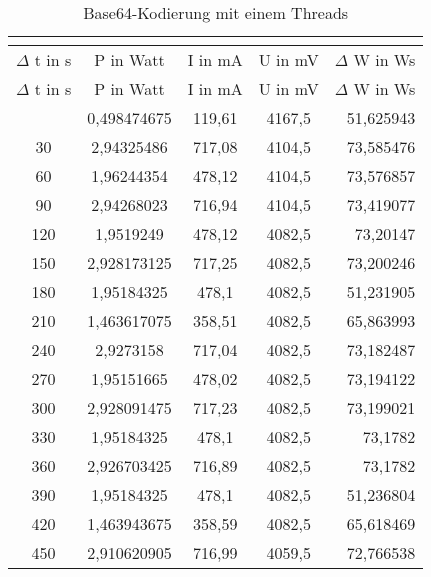 \begin{longtable}[c]{ccccc}
\caption{Base64-Kodierung mit einem Threads} \\
\label{tab:Base64MessungThreadEins}\\
\hline
{$\Delta$ t in s} & {P in Watt} & {I in mA} & {U in mV} & {$\Delta$ W in Ws} \\
\hline
\endfirsthead
\hline
$\Delta$ t in s & P in Watt & I in mA & U in mV & $\Delta$ W in Ws \\
\hline
\endhead
\hline
\endfoot
\hline
 \midrule
    0     & 0,498474675 & 119,61 & 4167,5 & \multicolumn{1}{r}{51,625943} \\
    \midrule
    30    & 2,94325486 & 717,08 & 4104,5 & \multicolumn{1}{r}{73,585476} \\
    \midrule
    60    & 1,96244354 & 478,12 & 4104,5 & \multicolumn{1}{r}{73,576857} \\
    \midrule
    90    & 2,94268023 & 716,94 & 4104,5 & \multicolumn{1}{r}{73,419077} \\
    \midrule
    120   & 1,9519249 & 478,12 & 4082,5 & \multicolumn{1}{r}{73,20147} \\
    \midrule
    150   & 2,928173125 & 717,25 & 4082,5 & \multicolumn{1}{r}{73,200246} \\
    \midrule
    180   & 1,95184325 & 478,1 & 4082,5 & \multicolumn{1}{r}{51,231905} \\
    \midrule
    210   & 1,463617075 & 358,51 & 4082,5 & \multicolumn{1}{r}{65,863993} \\
    \midrule
    240   & 2,9273158 & 717,04 & 4082,5 & \multicolumn{1}{r}{73,182487} \\
    \midrule
    270   & 1,95151665 & 478,02 & 4082,5 & \multicolumn{1}{r}{73,194122} \\
    \midrule
    300   & 2,928091475 & 717,23 & 4082,5 & \multicolumn{1}{r}{73,199021} \\
    \midrule
    330   & 1,95184325 & 478,1 & 4082,5 & \multicolumn{1}{r}{73,1782} \\
    \midrule
    360   & 2,926703425 & 716,89 & 4082,5 & \multicolumn{1}{r}{73,1782} \\
    \midrule
    390   & 1,95184325 & 478,1 & 4082,5 & \multicolumn{1}{r}{51,236804} \\
    \midrule
    420   & 1,463943675 & 358,59 & 4082,5 & \multicolumn{1}{r}{65,618469} \\
    \midrule
    450   & 2,910620905 & 716,99 & 4059,5 & \multicolumn{1}{r}{72,766538} \\

\end{longtable}
